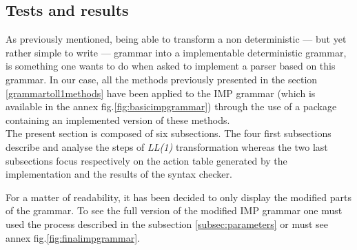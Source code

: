 \documentclass[a4paper,11pt]{article}
\begin{document}
  \subsection{Tests and results}
    \label{sec:results}
    As previously mentioned, being able to transform a non deterministic --- but yet rather simple to write --- grammar into a implementable deterministic grammar, is something one wants to do when asked to implement a parser based on this grammar. In our case, all the methods previously presented in the section \ref{grammartoll1methods} have been applied to the IMP grammar (which is available in the annex fig.\ref{fig:basicimpgrammar}) through the use of a package containing an implemented version of these methods.\\
    The present section is composed of six subsections. The four first subsections describe and analyse the steps of \textit{LL(1)} transformation whereas the two last subsections focus respectively on the action table generated by the implementation and the results of the syntax checker.\\
    \begin{tcolorbox}
      For a matter of readability, it has been decided to only display the modified parts of the grammar. To see the full version of the modified IMP grammar one must used the process described in the subsection \ref{subsec:parameters} or must see annex fig.\ref{fig:finalimpgrammar}.
    \end{tcolorbox}
    
\end{document}
